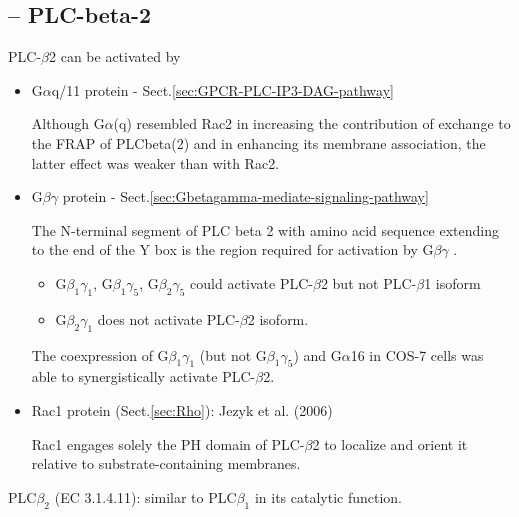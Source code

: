 % 

\subsection{-- PLC-beta-2}

PLC-$\beta$2 can be activated by 
\begin{itemize}
  \item G$\alpha$q/11 protein - Sect.\ref{sec:GPCR-PLC-IP3-DAG-pathway}

Although G$\alpha$(q) resembled Rac2 in increasing the contribution of exchange
to the FRAP of PLCbeta(2) and in enhancing its membrane association, the latter
effect was weaker than with Rac2.
 
  \item G$\beta\gamma$ protein - Sect.\ref{sec:Gbetagamma-mediate-signaling-pathway}
  
The N-terminal segment of PLC beta 2 with amino acid sequence extending to the
end of the Y box is the region required for activation by G$\beta\gamma$
\citep{wu1993}.
  \begin{itemize}
  \item G$\beta_1\gamma_1$, G$\beta_1\gamma_5$, G$\beta_2\gamma_5$ could activate
  PLC-$\beta$2 but not PLC-$\beta$1 isoform
  \item G$\beta_2\gamma_1$ does not activate PLC-$\beta$2 isoform.
\end{itemize}  
The coexpression of G$\beta_1\gamma_1$ (but not G$\beta_1\gamma_5$) and
G$\alpha$16 in COS-7 cells was able to synergistically activate PLC-$\beta$2.  


  \item Rac1 protein (Sect.\ref{sec:Rho}): Jezyk et al. (2006)
  
Rac1 engages solely the PH domain of PLC-$\beta$2 to localize and
orient it relative to substrate-containing membranes. 

\end{itemize} 

PLC$\beta_2$ (EC 3.1.4.11): similar to PLC$\beta_1$ in its catalytic function.
   
